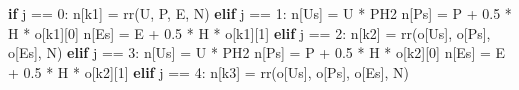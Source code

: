 \documentclass[
  a4paper,
]{ltjsarticle}
\newenvironment{Shaded}{}{}
\newcommand{\ControlFlowTok}[1]{\textcolor[rgb]{0.00,0.44,0.13}{\textbf{#1}}}
\newcommand{\DecValTok}[1]{\textcolor[rgb]{0.25,0.63,0.44}{#1}}
\newcommand{\FloatTok}[1]{\textcolor[rgb]{0.25,0.63,0.44}{#1}}
\newcommand{\NormalTok}[1]{#1}
\newcommand{\OperatorTok}[1]{\textcolor[rgb]{0.40,0.40,0.40}{#1}}
\newcommand{\StringTok}[1]{\textcolor[rgb]{0.25,0.44,0.63}{#1}}
\begin{document}
\begin{Shaded}
\begin{Highlighting}[]
    \ControlFlowTok{if}\NormalTok{ j }\OperatorTok{==} \DecValTok{0}\NormalTok{:}
\NormalTok{        n[}\StringTok{\textquotesingle{}k1\textquotesingle{}}\NormalTok{] }\OperatorTok{=}\NormalTok{ rr(U, P, E, N)}
    \ControlFlowTok{elif}\NormalTok{ j }\OperatorTok{==} \DecValTok{1}\NormalTok{:}
\NormalTok{        n[}\StringTok{\textquotesingle{}Us\textquotesingle{}}\NormalTok{] }\OperatorTok{=}\NormalTok{ U }\OperatorTok{*}\NormalTok{ PH2}
\NormalTok{        n[}\StringTok{\textquotesingle{}Ps\textquotesingle{}}\NormalTok{] }\OperatorTok{=}\NormalTok{ P }\OperatorTok{+} \FloatTok{0.5} \OperatorTok{*}\NormalTok{ H }\OperatorTok{*}\NormalTok{ o[}\StringTok{\textquotesingle{}k1\textquotesingle{}}\NormalTok{][}\DecValTok{0}\NormalTok{]}
\NormalTok{        n[}\StringTok{\textquotesingle{}Es\textquotesingle{}}\NormalTok{] }\OperatorTok{=}\NormalTok{ E }\OperatorTok{+} \FloatTok{0.5} \OperatorTok{*}\NormalTok{ H }\OperatorTok{*}\NormalTok{ o[}\StringTok{\textquotesingle{}k1\textquotesingle{}}\NormalTok{][}\DecValTok{1}\NormalTok{]}
    \ControlFlowTok{elif}\NormalTok{ j }\OperatorTok{==} \DecValTok{2}\NormalTok{:}
\NormalTok{        n[}\StringTok{\textquotesingle{}k2\textquotesingle{}}\NormalTok{] }\OperatorTok{=}\NormalTok{ rr(o[}\StringTok{\textquotesingle{}Us\textquotesingle{}}\NormalTok{], o[}\StringTok{\textquotesingle{}Ps\textquotesingle{}}\NormalTok{], o[}\StringTok{\textquotesingle{}Es\textquotesingle{}}\NormalTok{], N)}
    \ControlFlowTok{elif}\NormalTok{ j }\OperatorTok{==} \DecValTok{3}\NormalTok{:}
\NormalTok{        n[}\StringTok{\textquotesingle{}Us\textquotesingle{}}\NormalTok{] }\OperatorTok{=}\NormalTok{ U }\OperatorTok{*}\NormalTok{ PH2}
\NormalTok{        n[}\StringTok{\textquotesingle{}Ps\textquotesingle{}}\NormalTok{] }\OperatorTok{=}\NormalTok{ P }\OperatorTok{+} \FloatTok{0.5} \OperatorTok{*}\NormalTok{ H }\OperatorTok{*}\NormalTok{ o[}\StringTok{\textquotesingle{}k2\textquotesingle{}}\NormalTok{][}\DecValTok{0}\NormalTok{]}
\NormalTok{        n[}\StringTok{\textquotesingle{}Es\textquotesingle{}}\NormalTok{] }\OperatorTok{=}\NormalTok{ E }\OperatorTok{+} \FloatTok{0.5} \OperatorTok{*}\NormalTok{ H }\OperatorTok{*}\NormalTok{ o[}\StringTok{\textquotesingle{}k2\textquotesingle{}}\NormalTok{][}\DecValTok{1}\NormalTok{]}
    \ControlFlowTok{elif}\NormalTok{ j }\OperatorTok{==} \DecValTok{4}\NormalTok{:}
\NormalTok{        n[}\StringTok{\textquotesingle{}k3\textquotesingle{}}\NormalTok{] }\OperatorTok{=}\NormalTok{ rr(o[}\StringTok{\textquotesingle{}Us\textquotesingle{}}\NormalTok{], o[}\StringTok{\textquotesingle{}Ps\textquotesingle{}}\NormalTok{], o[}\StringTok{\textquotesingle{}Es\textquotesingle{}}\NormalTok{], N)}

\end{Highlighting}
\end{Shaded}
\end{document}
